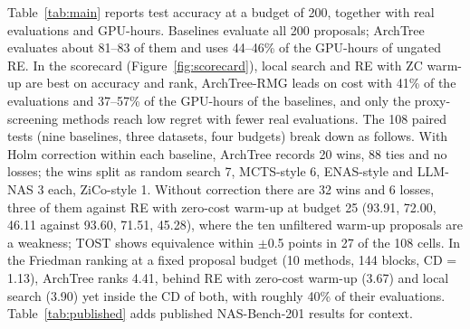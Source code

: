\documentclass{sadhana}
\newcommand{\algname}{ArchTree}
\newcommand{\rmg}{ArchTree-RMG}
\begin{document}
Table~\ref{tab:main} reports test accuracy at a budget of 200, together with real evaluations and GPU-hours. Baselines evaluate all 200 proposals; \algname{} evaluates about 81--83 of them and uses 44--46\% of the GPU-hours of ungated RE. In the scorecard (Figure~\ref{fig:scorecard}), local search and RE with ZC warm-up are best on accuracy and rank, \rmg{} leads on cost with 41\% of the evaluations and 37--57\% of the GPU-hours of the baselines, and only the proxy-screening methods reach low regret with fewer real evaluations. The 108 paired tests (nine baselines, three datasets, four budgets) break down as follows. With Holm correction within each baseline, \algname{} records 20 wins, 88 ties and no losses; the wins split as random search 7, MCTS-style 6, ENAS-style and LLM-NAS 3 each, ZiCo-style 1. Without correction there are 32 wins and 6 losses, three of them against RE with zero-cost warm-up at budget 25 (93.91, 72.00, 46.11 against 93.60, 71.51, 45.28), where the ten unfiltered warm-up proposals are a weakness; TOST shows equivalence within $\pm$0.5 points in 27 of the 108 cells. In the Friedman ranking at a fixed proposal budget (10 methods, 144 blocks, CD = 1.13), \algname{} ranks 4.41, behind RE with zero-cost warm-up (3.67) and local search (3.90) yet inside the CD of both, with roughly 40\% of their evaluations. Table~\ref{tab:published} adds published NAS-Bench-201 results for context.
\end{document}
